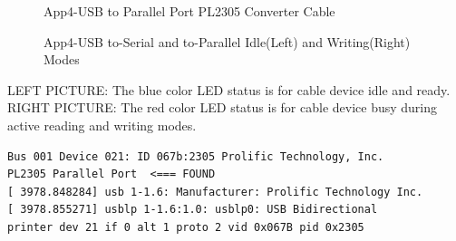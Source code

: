 \clearpage
\pagebreak
		\begin{figure}[htbp]
			\begin{center}
				\caption{App4-USB to Parallel Port PL2305 Converter Cable}
				\label{fig:App4-Captured-USB-to-Parallel-Port-PL2305-Converter.jpg}
			\end{center}
		\end{figure}

		\begin{figure}[htbp]
			\begin{center}
				\caption{App4-USB to-Serial and to-Parallel Idle(Left) and Writing(Right) Modes}
				\label{fig:App4-USB-to-Serial-Parallel-Idle-and Writing-Modes.jpg}
			\end{center}
		\end{figure}
		
LEFT PICTURE: The blue color LED status is for cable device idle and ready.\\
RIGHT PICTURE: The red color LED status is for cable device busy during active reading and writing modes.  
	
\lstset{basicstyle=\ttfamily\small}
\begin{lstlisting}[breaklines, frame=single, caption={App4-Detection of USB-to-Parallel Cable}, label=App4-usb-to-paralle-PL2305-cable-detected]
Bus 001 Device 021: ID 067b:2305 Prolific Technology, Inc. 
PL2305 Parallel Port  <=== FOUND 
[ 3978.848284] usb 1-1.6: Manufacturer: Prolific Technology Inc.
[ 3978.855271] usblp 1-1.6:1.0: usblp0: USB Bidirectional 
printer dev 21 if 0 alt 1 proto 2 vid 0x067B pid 0x2305
\end{lstlisting}

